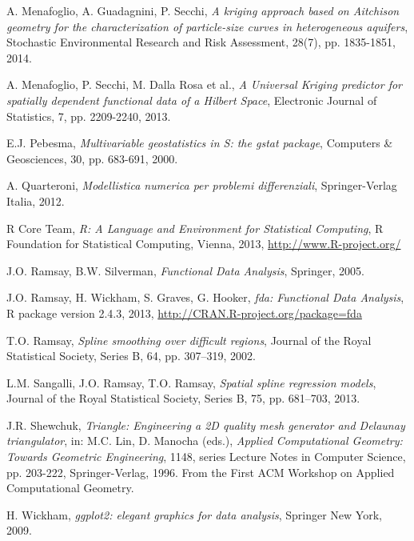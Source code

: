 \documentclass[a4paper,11pt,twoside,openright]{book}							%
\begin{document}
\begin{thebibliography}{99}
A. Menafoglio, A. Guadagnini, P. Secchi, \emph{A kriging approach based on Aitchison geometry for the characterization of particle-size curves in heterogeneous aquifers}, Stochastic Environmental Research and Risk Assessment, 28(7), pp. 1835-1851, 2014.

A. Menafoglio, P. Secchi, M. Dalla Rosa et al., \emph{A Universal Kriging predictor for spatially dependent functional data of a Hilbert Space}, Electronic Journal of Statistics, 7, pp. 2209-2240, 2013.

E.J. Pebesma, \emph{Multivariable geostatistics in S: the gstat package}, Computers \& Geosciences, 30, pp. 683-691, 2000.

A. Quarteroni, \emph{Modellistica numerica per problemi differenziali}, Springer-Verlag Italia, 2012.

R Core Team, \emph{R: A Language and Environment for Statistical Computing}, R Foundation for Statistical Computing, Vienna, 2013, \href{http://www.R-project.org/}{http://www.R-project.org/}

J.O. Ramsay, B.W. Silverman, \emph{Functional Data Analysis}, Springer, 2005.

J.O. Ramsay, H. Wickham, S. Graves, G. Hooker, \emph{fda: Functional Data Analysis}, R package version 2.4.3, 2013, \href{http://CRAN.R-project.org/package=fda}{http://CRAN.R-project.org/package=fda}

T.O. Ramsay, \emph{Spline smoothing over difficult regions}, Journal of the Royal Statistical Society, Series B, 64, pp. 307–319, 2002.


L.M. Sangalli, J.O. Ramsay, T.O. Ramsay, \emph{Spatial spline regression models}, Journal of the Royal Statistical Society, Series B, 75, pp. 681–703, 2013.

J.R. Shewchuk, \emph{Triangle: Engineering a 2D quality mesh generator and Delaunay triangulator}, in: M.C. Lin, D. Manocha (eds.), \emph{Applied Computational Geometry: Towards Geometric Engineering}, 1148, series Lecture Notes in Computer Science, pp. 203-222, Springer-Verlag, 1996. From the First ACM Workshop on Applied Computational Geometry.

H. Wickham, \emph{ggplot2: elegant graphics for data analysis}, Springer New York, 2009.


\end{thebibliography}
\end{document}
